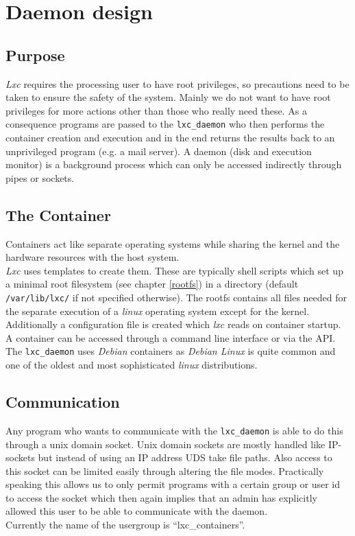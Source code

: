 \chapter{Daemon design}

\section{Purpose}

\textit{Lxc} requires the processing user to have root privileges, so precautions need to be taken to ensure
the safety of the system. Mainly we do not want to have root privileges for more actions other than those who really
need these. As a consequence programs are passed to the \texttt{lxc\_daemon} who then performs the container creation
and execution and in the end returns the results back to an unprivileged program (e.g. a mail server).
A daemon (disk and execution monitor) is a background process which can only be accessed indirectly through pipes
or sockets.

\section{The Container}

Containers act like separate operating systems while sharing the kernel and the hardware resources with the host system.\\
\textit{Lxc} uses templates to create them. These are typically shell scripts which set up a minimal root
filesystem (see chapter \ref{rootfs}) in a directory (default \texttt{/var/lib/lxc/} if not specified otherwise).
The rootfs contains all files needed for the separate execution of a \textit{linux} operating system except for the kernel.
Additionally a configuration file is created which \textit{lxc} reads on container startup.\\
A container can be accessed through a command line interface or via the API.
The \texttt{lxc\_daemon} uses \textit{Debian} containers as \textit{Debian Linux}\cite{debian} is quite common and one of
the oldest and most sophisticated \textit{linux} distributions.

\section{Communication}

Any program who wants to communicate with the \texttt{lxc\_daemon} is able to do this through a unix domain socket.
Unix domain sockets are mostly handled like IP-sockets but instead of using an IP address UDS take file paths.
Also access to this socket can be limited easily through altering the file modes.
Practically speaking this allows us to only permit programs with a certain group or user id to access the socket which then again
implies that an admin has explicitly allowed this user to be able to communicate with the daemon.\\
Currently the name of the usergroup is ``lxc\_containers''.

